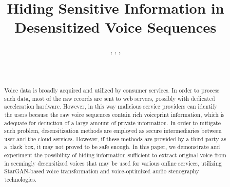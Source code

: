 \documentclass[journal]{IEEEtran} %
\begin{document}
\title{Hiding Sensitive Information in Desensitized Voice Sequences}

\author{%
    , %
    , %
    , 
    \\%
    \\%
    \\%
}

\maketitle

\begin{abstract}
Voice data is broadly acquired and utilized by consumer services. In order to process such data, most of the raw records are sent to web servers, possibly with dedicated acceleration hardware. However, in this way malicious service providers can identify the users because the raw voice sequences contain rich voiceprint information, which is adequate for deduction of a large amount of private information. In order to mitigate such problem, desensitization methods are employed as secure intermediaries between user and the cloud services. However, if these methods are provided by a third party as a black box, it may not proved to be safe enough. In this paper, we demonstrate and experiment the possibility of hiding information sufficient to extract original voice from in seemingly desensitized voices that may be used for various online services, utilizing StarGAN-based voice transformation and voice-optimized audio stenography technologies.
\end{abstract}
\end{document}
